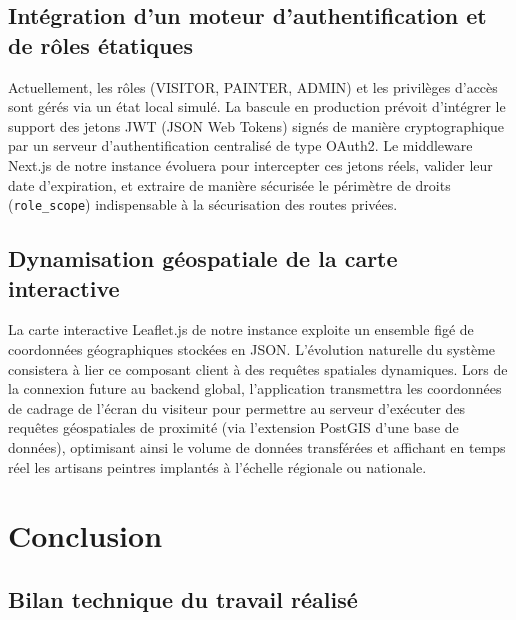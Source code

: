 \documentclass[12pt,a4paper]{report}
\begin{document}
\subsection{Intégration d'un moteur d'authentification et de rôles étatiques}

Actuellement, les rôles (VISITOR, PAINTER, ADMIN) et les privilèges d'accès sont gérés via un état local simulé. La bascule en production prévoit d'intégrer le support des jetons JWT (JSON Web Tokens) signés de manière cryptographique par un serveur d'authentification centralisé de type OAuth2. Le middleware Next.js de notre instance évoluera pour intercepter ces jetons réels, valider leur date d'expiration, et extraire de manière sécurisée le périmètre de droits (\texttt{role\_scope}) indispensable à la sécurisation des routes privées.

\subsection{Dynamisation géospatiale de la carte interactive}

La carte interactive Leaflet.js de notre instance exploite un ensemble figé de coordonnées géographiques stockées en JSON. L'évolution naturelle du système consistera à lier ce composant client à des requêtes spatiales dynamiques. Lors de la connexion future au backend global, l'application transmettra les coordonnées de cadrage de l'écran du visiteur pour permettre au serveur d'exécuter des requêtes géospatiales de proximité (via l'extension PostGIS d'une base de données), optimisant ainsi le volume de données transférées et affichant en temps réel les artisans peintres implantés à l'échelle régionale ou nationale.

\newpage
\section{Conclusion}

\subsection{Bilan technique du travail réalisé}
\end{document}
